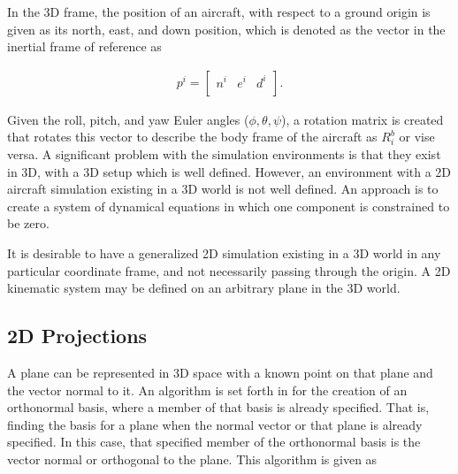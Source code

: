 In the 3D frame, the position of an aircraft, with respect to a ground origin is given as its north, east, and down position, which is denoted as the vector in the inertial frame of reference as

\begin{align}
    p^i =
    \begin{bmatrix}
        n^i & e^i & d^i\\
    \end{bmatrix}
    .
\end{align}

Given the roll, pitch, and yaw Euler angles ($\phi, \theta, \psi$), a rotation matrix is created that rotates this vector to describe the body frame of the aircraft as $R_i^b$ or vise versa. 
A significant problem with the simulation environments is that they exist in 3D, with a 3D setup which is well defined. 
However, an environment with a 2D aircraft simulation existing in a 3D world is not well defined.
An approach is to create a system of dynamical equations in which one component is constrained to be zero.

It is desirable to have a generalized 2D simulation existing in a 3D world in any particular coordinate frame, and not necessarily passing through the origin. 
A 2D kinematic system may be defined on an arbitrary plane in the 3D world.

\subsection{2D Projections}
\label{sec:2DProjection}

A plane can be represented in 3D space with a known point on that plane and the vector normal to it.
An algorithm is set forth in \cite{duffBuildingOrthonormalBasis} for the creation of an orthonormal basis, where a member of that basis is already specified. That is, finding the basis for a plane when the normal vector or that plane is already specified. In this case, that specified member of the orthonormal basis is the vector normal or orthogonal to the plane.
This algorithm is given as


